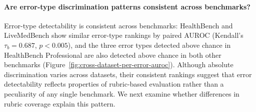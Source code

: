 \documentclass{article}
\begin{document}
\paragraph{\textbf{Are error-type discrimination patterns consistent across benchmarks?}}
Error-type detectability is consistent across benchmarks: HealthBench and LiveMedBench show similar error-type rankings by paired AUROC (Kendall's $\tau_b = 0.687$, $p < 0.005$), and the three error types detected above chance in HealthBench Professional are also detected above chance in both other benchmarks (Figure~\ref{fig:cross-dataset-per-error-auroc}). Although absolute discrimination varies across datasets, their consistent rankings suggest that error detectability reflects properties of rubric-based evaluation rather than a peculiarity of any single benchmark. We next examine whether differences in rubric coverage explain this pattern.
\end{document}
